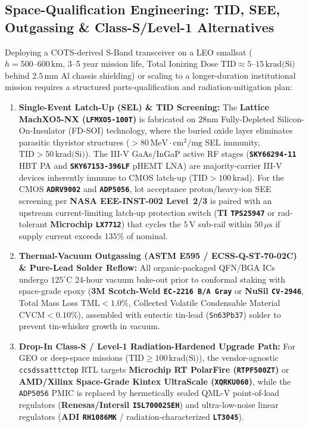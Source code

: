 \documentclass[10pt,a4paper]{article}
\renewcommand{\_}{\origunderscore\penalty0\hskip0pt\relax}
\numberwithin{equation}{section}
\numberwithin{table}{section}
\numberwithin{figure}{section}
\begin{document}
\subsection{Space-Qualification Engineering: TID, SEE, Outgassing \& Class-S/Level-1 Alternatives}
Deploying a COTS-derived S-Band transceiver on a LEO smallsat ($h = 500\text{--}600\,\text{km}$, 3--5 year mission life, Total Ionizing Dose $\text{TID} \approx 5\text{--}15\,\text{krad(Si)}$ behind $2.5\,\text{mm}$ Al chassis shielding) or scaling to a longer-duration institutional mission requires a structured parts-qualification and radiation-mitigation plan:
\begin{enumerate}\setlength{\itemsep}{2pt}
  \item \textbf{Single-Event Latch-Up (SEL) \& TID Screening:} The \textbf{Lattice MachXO5-NX (\texttt{LFMXO5-100T})} is fabricated on 28nm Fully-Depleted Silicon-On-Insulator (FD-SOI) technology, where the buried oxide layer eliminates parasitic thyristor structures ($>80\,\text{MeV}\cdot\text{cm}^2/\text{mg}$ SEL immunity, $\text{TID} > 50\,\text{krad(Si)}$). The III-V GaAs/InGaP active RF stages (\textbf{\texttt{SKY66294-11}} HBT PA and \textbf{\texttt{SKY67153-396LF}} pHEMT LNA) are majority-carrier III-V devices inherently immune to CMOS latch-up ($\text{TID} > 100\,\text{krad}$). For the CMOS \textbf{\texttt{ADRV9002}} and \textbf{\texttt{ADP5056}}, lot acceptance proton/heavy-ion SEE screening per \textbf{NASA EEE-INST-002 Level~2/3} is paired with an upstream current-limiting latch-up protection switch (\textbf{TI \texttt{TPS25947}} or rad-tolerant \textbf{Microchip \texttt{LX7712}}) that cycles the $5\,\text{V}$ sub-rail within $50\,\mu\text{s}$ if supply current exceeds $135\%$ of nominal.
  \item \textbf{Thermal-Vacuum Outgassing (ASTM E595 / ECSS-Q-ST-70-02C) \& Pure-Lead Solder Reflow:} All organic-packaged QFN/BGA ICs undergo $125^\circ\text{C}$ 24-hour vacuum bake-out prior to conformal staking with space-grade epoxy (\textbf{3M Scotch-Weld \texttt{EC-2216 B/A Gray}} or \textbf{NuSil \texttt{CV-2946}}, Total Mass Loss $\text{TML} < 1.0\%$, Collected Volatile Condensable Material $\text{CVCM} < 0.10\%$), assembled with eutectic tin-lead (\texttt{Sn63Pb37}) solder to prevent tin-whisker growth in vacuum.
  \item \textbf{Drop-In Class-S / Level-1 Radiation-Hardened Upgrade Path:} For GEO or deep-space missions ($\text{TID} \ge 100\,\text{krad(Si)}$), the vendor-agnostic \texttt{ccsds\_sat\_ttc\_top} RTL targets \textbf{Microchip RT PolarFire (\texttt{RTPF500ZT})} or \textbf{AMD/Xilinx Space-Grade Kintex UltraScale (\texttt{XQRKU060})}, while the \texttt{ADP5056} PMIC is replaced by hermetically sealed QML-V point-of-load regulators (\textbf{Renesas/Intersil \texttt{ISL70002SEH}}) and ultra-low-noise linear regulators (\textbf{ADI \texttt{RH1086MK}} / radiation-characterized \textbf{\texttt{LT3045}}).
\end{enumerate}
\end{document}
